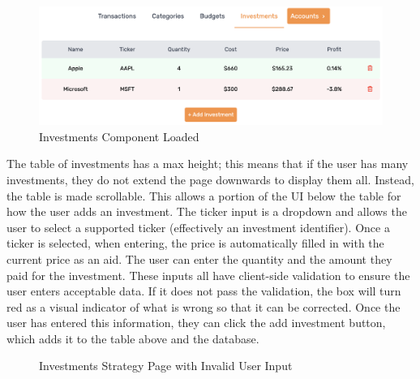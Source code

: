 \begin{figure}[H]
	\centering
	\includegraphics[width=\textwidth]{images/investments_loaded.png}
	\caption{Investments Component Loaded}
	\label{fig:InvestmentsLoaded}
\end{figure}

The table of investments has a max height; this means that if the user has many investments, they do not extend the page downwards to display them all. Instead, the table is made scrollable. This allows a portion of the UI below the table for how the user adds an investment. The ticker input is a dropdown and allows the user to select a supported ticker (effectively an investment identifier). Once a ticker is selected, when entering, the price is automatically filled in with the current price as an aid. The user can enter the quantity and the amount they paid for the investment. These inputs all have client-side validation to ensure the user enters acceptable data. If it does not pass the validation, the box will turn red as a visual indicator of what is wrong so that it can be corrected. Once the user has entered this information, they can click the add investment button, which adds it to the table above and the database.

\begin{figure}[H]
	\centering
	\caption{Investments Strategy Page with Invalid User Input}
	\label{fig:InvestmentsError}
\end{figure}


